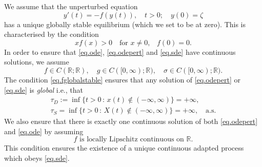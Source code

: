\documentclass[a4paper,10pt,reqno]{amsart}
\numberwithin{equation}{section}
\theoremstyle{definition}
\theoremstyle{remark}
\DeclareMathOperator{\1}{\mathbbm 1}
\begin{document}
	We assume that the unperturbed equation
	\begin{equation} \label{eq.ode}
		y'(t)=-f(y(t)), \quad t>0; \quad y(0)=\zeta
	\end{equation}
	has a unique globally stable equilibrium (which we set to be at zero). This is characterised by the condition
	\begin{equation} \label{eq.fglobalstable}
		xf(x)>0 \quad\text{for $x\neq 0$,} \quad f(0)=0.
	\end{equation}
	In order to ensure that \eqref{eq.ode}, \eqref{eq.odepert} and \eqref{eq.sde} have
	continuous solutions, we assume
	\begin{equation} \label{eq.fgsigmacns}
		f\in C(\mathbb{R};\mathbb{R}), \quad g\in C([0,\infty);\mathbb{R}), \quad \sigma\in C([0,\infty);\mathbb{R}).
	\end{equation}
	The condition \eqref{eq.fglobalstable} ensures that any solution of \eqref{eq.odepert} or \eqref{eq.sde} is \emph{global} i.e., that
	\begin{align*}
		\tau_D:=\inf\{t>0\,:\,x(t)\not\in (-\infty,\infty)\}=+\infty, \\ 
		\tau_S=\inf\{t>0\,:\, X(t)\not\in (-\infty,\infty)\}=+\infty, \quad \text{a.s.}
	\end{align*}
	We also ensure that there is exactly one continuous solution of both \eqref{eq.odepert} and \eqref{eq.ode} by assuming
	\begin{equation} \label{eq.floclip}
		\text{$f$ is locally Lipschitz continuous on $\mathbb{R}$}.
	\end{equation}
	This condition ensures the existence of a unique continuous adapted process which obeys \eqref{eq.sde}. 
	
\end{document}
